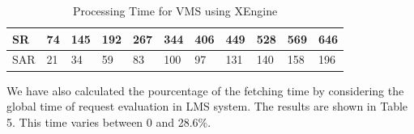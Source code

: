 \begin{table}[t]
\begin{tabular}{|l|l|l|l|l|l|l|l|l|l|l|}
\scriptsize  {SR}
& \scriptsize  {74}
& \scriptsize {145}
& \scriptsize {192}
& \scriptsize {267}
& \scriptsize {344}
& \scriptsize {406}
& \scriptsize {449}
& \scriptsize {528}
& \scriptsize {569}
& \scriptsize {646}
\\ \hline

\scriptsize  {SAR}
& \scriptsize {21}
& \scriptsize {34}
& \scriptsize {59}
& \scriptsize {83}
& \scriptsize {100}
& \scriptsize {97}
& \scriptsize {131}
& \scriptsize {140}
& \scriptsize {158}
& \scriptsize {196}
\\ \hline
\end{tabular}
\caption{Processing Time for VMS using XEngine}\end{table}
We have also calculated the pourcentage of the fetching time by considering the global time of request evaluation in LMS system.
The results are shown in Table 5. This time varies between 0 and 28.6\%.

